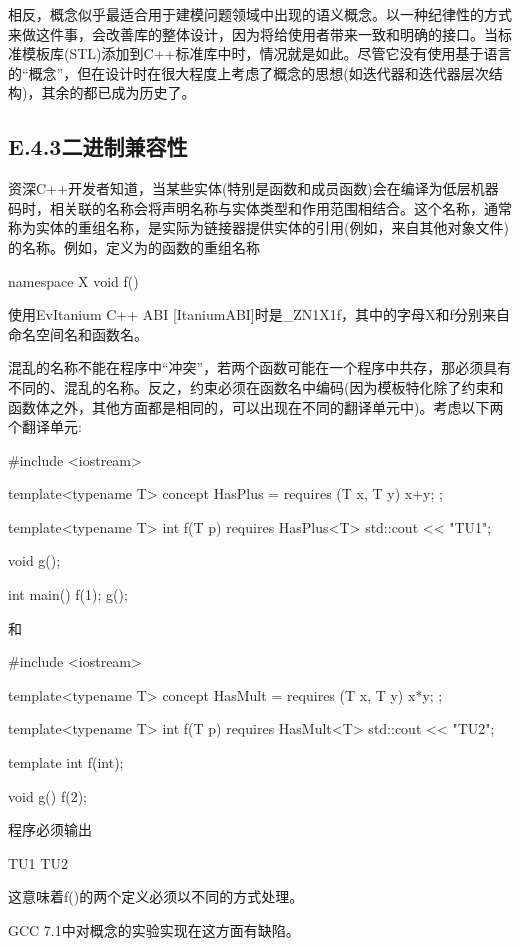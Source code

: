 相反，概念似乎最适合用于建模问题领域中出现的语义概念。以一种纪律性的方式来做这件事，会改善库的整体设计，因为将给使用者带来一致和明确的接口。当标准模板库(STL)添加到C++标准库中时，情况就是如此。尽管它没有使用基于语言的“概念”，但在设计时在很大程度上考虑了概念的思想(如迭代器和迭代器层次结构)，其余的都已成为历史了。

\subsection{E.4.3\hspace{0.2cm}二进制兼容性}

资深C++开发者知道，当某些实体(特别是函数和成员函数)会在编译为低层机器码时，相关联的名称会将声明名称与实体类型和作用范围相结合。这个名称，通常称为实体的重组名称，是实际为链接器提供实体的引用(例如，来自其他对象文件)的名称。例如，定义为的函数的重组名称

\begin{cpp}
namespace X {
	void f() {}
}
\end{cpp}

使用EvItanium C++ ABI [ItaniumABI]时是\_ZN1X1f，其中的字母X和f分别来自命名空间名和函数名。

混乱的名称不能在程序中“冲突”，若两个函数可能在一个程序中共存，那必须具有不同的、混乱的名称。反之，约束必须在函数名中编码(因为模板特化除了约束和函数体之外，其他方面都是相同的，可以出现在不同的翻译单元中)。考虑以下两个翻译单元:

\begin{cpp}
#include <iostream>

template<typename T>
concept HasPlus = requires (T x, T y) {
	x+y;
};

template<typename T> int f(T p) requires HasPlus<T> {
	std::cout << "TU1\n";
}

void g();

int main() {
	f(1);
	g();
}
\end{cpp}

和

\begin{cpp}
#include <iostream>

template<typename T>
concept HasMult = requires (T x, T y) {
	x*y;
};

template<typename T> int f(T p) requires HasMult<T> {
	std::cout << "TU2\n";
}

template int f(int);

void g() {
	f(2);
}
\end{cpp}

程序必须输出

\begin{shell}
TU1
TU2
\end{shell}

这意味着f()的两个定义必须以不同的方式处理。

\begin{notice}GCC 7.1中对概念的实验实现在这方面有缺陷。
\end{notice}























